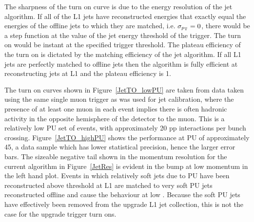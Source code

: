 The sharpness of the turn on curve is due to the energy resolution of the jet algorithm.
If all of the \ac{L1} jets have reconstructed energies that exactly equal the energies of the offline jets to which they are matched,
i.e. $\sigma_{p_{\text{T}}} = 0$, there would be a step function at the value of the jet energy threshold of the trigger.
The turn on would be instant at the specified trigger threshold.
%
The plateau efficiency of the turn on is dictated by the matching efficiency of the jet algorithm.
If all \ac{L1} jets are perfectly matched to offline jets then the algorithm is fully efficient at reconstructing jets at \ac{L1} and the plateau efficiency is 1.

The turn on curves shown in Figure~\ref{JetTO_lowPU} are taken from data taken using the same single muon trigger as was used for jet calibration, where the presence of at least one muon in each event implies there is often hadronic activity in the opposite hemisphere of the detector to the muon. 
This is a relatively low \ac{PU} set of events, with approximately 20 pp interactions per bunch crossing. 
Figure~\ref{JetTO_highPU} shows the performance at \ac{PU} of approximately 45, a data sample which has lower statistical precision, hence the larger error bars.
The sizeable negative tail shown in the momentum resolution for the current algorithm in Figure~\ref{JetRes} is 
evident in the bump at low momentum in the left hand plot.
Events in which relatively soft jets due to \ac{PU} have been reconstructed above threshold at \ac{L1} are 
matched to very soft \ac{PU} jets reconstructed offline and cause the behaviour at low \pt.
Because the soft \ac{PU} jets have effectively been removed from the upgrade \ac{L1} jet collection, this is not the case for the upgrade trigger turn ons.


